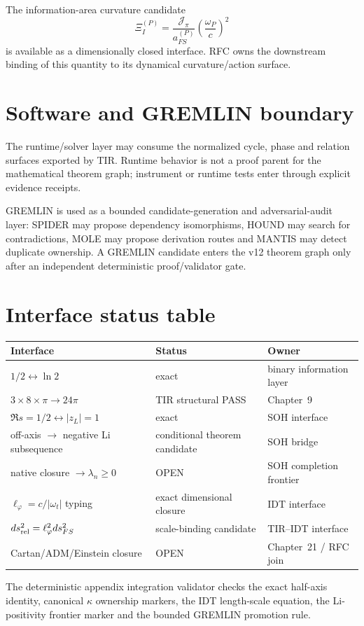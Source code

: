 The information-area curvature candidate
\[
\Xi_I^{(P)}
=
\frac{\mathcal J_\pi}{a_{FS}^{(P)}}
\left(\frac{\omega_P}{c}\right)^2
\]
is available as a dimensionally closed interface.  RFC owns the downstream
binding of this quantity to its dynamical curvature/action surface.

\section{Software and GREMLIN boundary}

The runtime/solver layer may consume the normalized cycle, phase and relation
surfaces exported by TIR.  Runtime behavior is not a proof parent for the
mathematical theorem graph; instrument or runtime tests enter through explicit
evidence receipts.

GREMLIN is used as a bounded candidate-generation and adversarial-audit layer:
SPIDER may propose dependency isomorphisms, HOUND may search for contradictions,
MOLE may propose derivation routes and MANTIS may detect duplicate ownership.
A GREMLIN candidate enters the v12 theorem graph only after an independent
deterministic proof/validator gate.

\section{Interface status table}

\begin{center}
\begin{tabular}{p{}p{}p{}}
\toprule
Interface & Status & Owner\\
\midrule
\(1/2\leftrightarrow\ln2\) & exact & binary information layer\\
\(3\times8\times\pi\to24\pi\) & TIR structural PASS & Chapter~9\\
\(\Re s=1/2\leftrightarrow|z_L|=1\) & exact & SOH interface\\
off-axis \(\to\) negative Li subsequence & conditional theorem candidate & SOH bridge\\
native closure \(\to\lambda_n\ge0\) & OPEN & SOH completion frontier\\
\(\ell_\varphi=c/|\omega_t|\) typing & exact dimensional closure & IDT interface\\
\(ds_{\rm rel}^2=\ell_\varphi^2ds_{FS}^2\) & scale-binding candidate & TIR--IDT interface\\
Cartan/ADM/Einstein closure & OPEN & Chapter~21 / RFC join\\
\bottomrule
\end{tabular}
\end{center}

The deterministic appendix integration validator checks the exact half-axis
identity, canonical \(\kappa\) ownership markers, the IDT length-scale equation,
the Li-positivity frontier marker and the bounded GREMLIN promotion rule.
